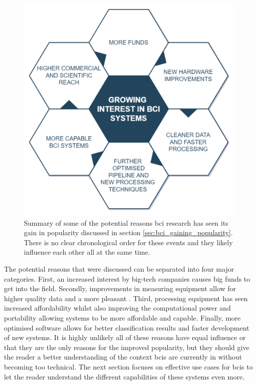 \begin{figure}[ht]
    \centering
    \includegraphics[width=0.7\linewidth]{../images/introduction/cyclic_interest_gain.pdf}
    \captionsetup{width=0.7\linewidth}
    \captionsetup{justification=centering}
    \caption{Summary of some of the potential reasons \gls{bci} research has seen its gain in popularity discussed in section \ref{sec:bci_gaining_popularity}. There is no clear chronological order for these events and they likely influence each other all at the same time.} 
    \label{fig:cyclic_popularity_increase}
\end{figure}

The potential reasons that were discussed can be separated into four major categories.
First, an increased interest by big-tech companies causes big funds to get into the field.
Secondly, improvements in measuring equipment allow for higher quality data and a more pleasant .
Third, processing equipment has seen increased affordability whilst also improving the computational power and portability allowing systems to be more affordable and capable.
Finally, more optimised software allows for better classification results and faster development of new systems.
It is highly unlikely all of these reasons have equal influence or that they are the only reasons for the improved popularity, but they should give the reader a better understanding of the context \glspl{bci} are currently in without becoming too technical.
The next section focuses on effective use cases for \glspl{bci} to let the reader understand the different capabilities of these systems even more.



